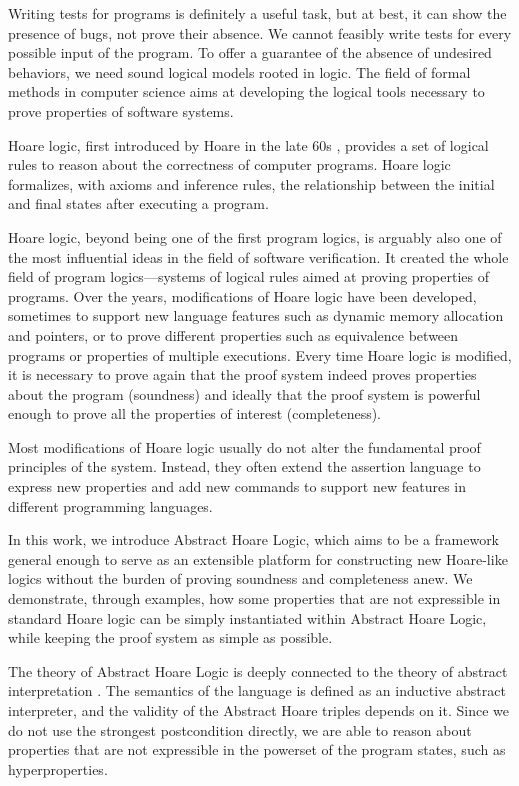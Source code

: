 \documentclass[
  10pt,       %
  twoside,    %
  a4paper,    %
  english,    %
  tikz,       %
  openright,  %
]{book}
\begin{document}
Writing tests for programs is definitely a useful task, but at best, it can
show the presence of bugs, not prove their absence. We cannot feasibly write
tests for every possible input of the program. To offer a guarantee of the
absence of undesired behaviors, we need sound logical models rooted in logic.
The field of formal methods in computer science aims at developing the logical
tools necessary to prove properties of software systems.

Hoare logic, first introduced by Hoare in the late 60s \cite{Hoare69}, provides
a set of logical rules to reason about the correctness of computer programs.
Hoare logic formalizes, with axioms and inference rules, the relationship
between the initial and final states after executing a program.

Hoare logic, beyond being one of the first program logics, is arguably also one
of the most influential ideas in the field of software verification. It created
the whole field of program logics—systems of logical rules aimed at proving
properties of programs. Over the years, modifications of Hoare logic have been
developed, sometimes to support new language features such as dynamic memory
allocation and pointers, or to prove different properties such as equivalence
between programs or properties of multiple executions. Every time Hoare logic
is modified, it is necessary to prove again that the proof system indeed proves
properties about the program (soundness) and ideally that the proof system is
powerful enough to prove all the properties of interest (completeness).

Most modifications of Hoare logic usually do not alter the fundamental proof
principles of the system. Instead, they often extend the assertion language to
express new properties and add new commands to support new features in
different programming languages.

In this work, we introduce Abstract Hoare Logic, which aims to be a framework
general enough to serve as an extensible platform for constructing new
Hoare-like logics without the burden of proving soundness and completeness
anew. We demonstrate, through examples, how some properties that are not
expressible in standard Hoare logic can be simply instantiated within Abstract
Hoare Logic, while keeping the proof system as simple as possible.

The theory of Abstract Hoare Logic is deeply connected to the theory of
abstract interpretation \cite{Cousot77}. The semantics of the language is
defined as an inductive abstract interpreter, and the validity of the Abstract
Hoare triples depends on it. Since we do not use the strongest postcondition
directly, we are able to reason about properties that are not expressible in
the powerset of the program states, such as hyperproperties.
\end{document}
